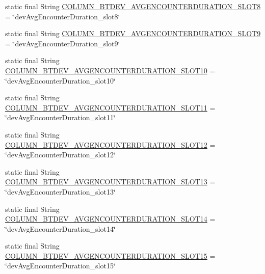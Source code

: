 \begin{DoxyCompactItemize}
\item 
static final String \hyperlink{classcs_1_1nsense_1_1db_1_1_n_sense_s_q_lite_helper_acddc3fed55cd2104452b8ced0bc2e616}{C\-O\-L\-U\-M\-N\-\_\-\-B\-T\-D\-E\-V\-\_\-\-A\-V\-G\-E\-N\-C\-O\-U\-N\-T\-E\-R\-D\-U\-R\-A\-T\-I\-O\-N\-\_\-\-S\-L\-O\-T8} = \char`\"{}dev\-Avg\-Encounter\-Duration\-\_\-slot8\char`\"{}
\item 
static final String \hyperlink{classcs_1_1nsense_1_1db_1_1_n_sense_s_q_lite_helper_a6db3acd70272fce4a431e6f529acbf7f}{C\-O\-L\-U\-M\-N\-\_\-\-B\-T\-D\-E\-V\-\_\-\-A\-V\-G\-E\-N\-C\-O\-U\-N\-T\-E\-R\-D\-U\-R\-A\-T\-I\-O\-N\-\_\-\-S\-L\-O\-T9} = \char`\"{}dev\-Avg\-Encounter\-Duration\-\_\-slot9\char`\"{}
\item 
static final String \hyperlink{classcs_1_1nsense_1_1db_1_1_n_sense_s_q_lite_helper_a95a081220d68d8e653f3b185c85e2590}{C\-O\-L\-U\-M\-N\-\_\-\-B\-T\-D\-E\-V\-\_\-\-A\-V\-G\-E\-N\-C\-O\-U\-N\-T\-E\-R\-D\-U\-R\-A\-T\-I\-O\-N\-\_\-\-S\-L\-O\-T10} = \char`\"{}dev\-Avg\-Encounter\-Duration\-\_\-slot10\char`\"{}
\item 
static final String \hyperlink{classcs_1_1nsense_1_1db_1_1_n_sense_s_q_lite_helper_ae18ebf70e1ed9a14210d2b1b24ec4726}{C\-O\-L\-U\-M\-N\-\_\-\-B\-T\-D\-E\-V\-\_\-\-A\-V\-G\-E\-N\-C\-O\-U\-N\-T\-E\-R\-D\-U\-R\-A\-T\-I\-O\-N\-\_\-\-S\-L\-O\-T11} = \char`\"{}dev\-Avg\-Encounter\-Duration\-\_\-slot11\char`\"{}
\item 
static final String \hyperlink{classcs_1_1nsense_1_1db_1_1_n_sense_s_q_lite_helper_a8b66fb3e7675417d15034e51c6031bd1}{C\-O\-L\-U\-M\-N\-\_\-\-B\-T\-D\-E\-V\-\_\-\-A\-V\-G\-E\-N\-C\-O\-U\-N\-T\-E\-R\-D\-U\-R\-A\-T\-I\-O\-N\-\_\-\-S\-L\-O\-T12} = \char`\"{}dev\-Avg\-Encounter\-Duration\-\_\-slot12\char`\"{}
\item 
static final String \hyperlink{classcs_1_1nsense_1_1db_1_1_n_sense_s_q_lite_helper_a032e9a2a6b81ee461d88cd3e20da323c}{C\-O\-L\-U\-M\-N\-\_\-\-B\-T\-D\-E\-V\-\_\-\-A\-V\-G\-E\-N\-C\-O\-U\-N\-T\-E\-R\-D\-U\-R\-A\-T\-I\-O\-N\-\_\-\-S\-L\-O\-T13} = \char`\"{}dev\-Avg\-Encounter\-Duration\-\_\-slot13\char`\"{}
\item 
static final String \hyperlink{classcs_1_1nsense_1_1db_1_1_n_sense_s_q_lite_helper_abcc96b7e96f231319c945b5a1c0dfed4}{C\-O\-L\-U\-M\-N\-\_\-\-B\-T\-D\-E\-V\-\_\-\-A\-V\-G\-E\-N\-C\-O\-U\-N\-T\-E\-R\-D\-U\-R\-A\-T\-I\-O\-N\-\_\-\-S\-L\-O\-T14} = \char`\"{}dev\-Avg\-Encounter\-Duration\-\_\-slot14\char`\"{}
\item 
static final String \hyperlink{classcs_1_1nsense_1_1db_1_1_n_sense_s_q_lite_helper_aa2b4166df8ffcaed76068483d9d21fba}{C\-O\-L\-U\-M\-N\-\_\-\-B\-T\-D\-E\-V\-\_\-\-A\-V\-G\-E\-N\-C\-O\-U\-N\-T\-E\-R\-D\-U\-R\-A\-T\-I\-O\-N\-\_\-\-S\-L\-O\-T15} = \char`\"{}dev\-Avg\-Encounter\-Duration\-\_\-slot15\char`\"{}

\end{DoxyCompactItemize}
